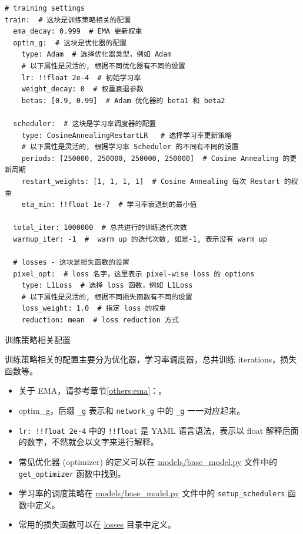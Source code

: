 \documentclass[../main.tex]{subfiles}
\begin{document}
\begin{verbatim}
# training settings
train:  # 这块是训练策略相关的配置
  ema_decay: 0.999  # EMA 更新权重
  optim_g:  # 这块是优化器的配置
    type: Adam  # 选择优化器类型，例如 Adam
    # 以下属性是灵活的, 根据不同优化器有不同的设置
    lr: !!float 2e-4  # 初始学习率
    weight_decay: 0  # 权重衰退参数
    betas: [0.9, 0.99]  # Adam 优化器的 beta1 和 beta2

  scheduler:  # 这块是学习率调度器的配置
    type: CosineAnnealingRestartLR   # 选择学习率更新策略
    # 以下属性是灵活的, 根据学习率 Scheduler 的不同有不同的设置
    periods: [250000, 250000, 250000, 250000]  # Cosine Annealing 的更新周期
    restart_weights: [1, 1, 1, 1]  # Cosine Annealing 每次 Restart 的权重
    eta_min: !!float 1e-7  # 学习率衰退到的最小值

  total_iter: 1000000  # 总共进行的训练迭代次数
  warmup_iter: -1  #  warm up 的迭代次数, 如是-1, 表示没有 warm up

  # losses - 这块是损失函数的设置
  pixel_opt:  # loss 名字，这里表示 pixel-wise loss 的 options
    type: L1Loss  # 选择 loss 函数，例如 L1Loss
    # 以下属性是灵活的, 根据不同损失函数有不同的设置
    loss_weight: 1.0  # 指定 loss 的权重
    reduction: mean  # loss reduction 方式
\end{verbatim}

\begin{exampleBox}[righthand ratio=0.00, sidebyside, sidebyside align=center, lower separated=false]{训练策略相关配置}

    训练策略相关的配置主要分为优化器，学习率调度器，总共训练 iterations，损失函数等。
    \begin{itemize}
        \item 关于 EMA，请参考章节\ref{others:ema}：。
        \item optim\_g，后缀 \texttt{\_g} 表示和 \texttt{network\_g} 中的 \texttt{\_g} 一一对应起来。
        \item \texttt{lr: !!float 2e-4} 中的 \texttt{!!float} 是 YAML 语言语法，表示以 float 解释后面的数字，不然就会以文字来进行解释。
        \item 常见优化器 (optimizer) 的定义可以在 \href{https://github.com/XPixelGroup/BasicSR/blob/master/basicsr/models/base_model.py}{models/base\_model.py} 文件中的 \texttt{get\_optimizer} 函数中找到。
        \item 学习率的调度策略在 \href{https://github.com/XPixelGroup/BasicSR/blob/master/basicsr/models/base_model.py}{models/base\_model.py}  文件中的 \texttt{setup\_schedulers} 函数中定义。
        \item 常用的损失函数可以在 \href{https://github.com/XPixelGroup/BasicSR/tree/master/basicsr/losses}{losses} 目录中定义。
    \end{itemize}
\end{exampleBox}
\end{document}
